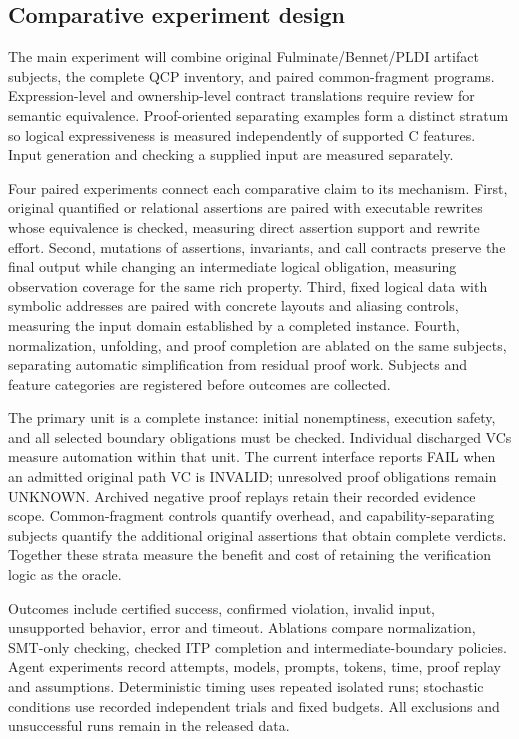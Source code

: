 \subsection{Comparative experiment design}

The main experiment will combine original Fulminate/Bennet/PLDI artifact
subjects, the complete QCP inventory, and paired common-fragment programs.
Expression-level and ownership-level contract translations require review for
semantic equivalence. Proof-oriented separating examples form a distinct
stratum so logical expressiveness is measured independently of supported C
features. Input generation and checking a supplied input are measured separately.

Four paired experiments connect each comparative claim to its mechanism.
First, original quantified or relational assertions are paired with executable
rewrites whose equivalence is checked, measuring direct assertion support and
rewrite effort. Second, mutations of assertions, invariants, and call contracts
preserve the final output while changing an intermediate logical obligation,
measuring observation coverage for the same rich property. Third, fixed logical
data with symbolic addresses are paired with concrete layouts and aliasing
controls, measuring the input domain established by a completed instance.
Fourth, normalization, unfolding, and proof completion are ablated on the same
subjects, separating automatic simplification from residual proof work.
Subjects and feature categories are registered before outcomes are collected.

The primary unit is a complete instance: initial nonemptiness, execution safety,
and all selected boundary obligations must be checked. Individual discharged
VCs measure automation within that unit. The current interface reports FAIL when an admitted original path VC is
INVALID; unresolved proof obligations remain UNKNOWN. Archived negative proof
replays retain their recorded evidence scope. Common-fragment controls quantify overhead,
and capability-separating subjects quantify the additional original assertions
that obtain complete verdicts. Together these strata measure the benefit and
cost of retaining the verification logic as the oracle.

Outcomes include certified success, confirmed violation, invalid input,
unsupported behavior, error and timeout. Ablations compare normalization,
SMT-only checking, checked ITP completion and intermediate-boundary policies.
Agent experiments record attempts, models, prompts, tokens, time, proof replay
and assumptions. Deterministic timing uses repeated isolated runs; stochastic
conditions use recorded independent trials and fixed budgets. All exclusions
and unsuccessful runs remain in the released data.

